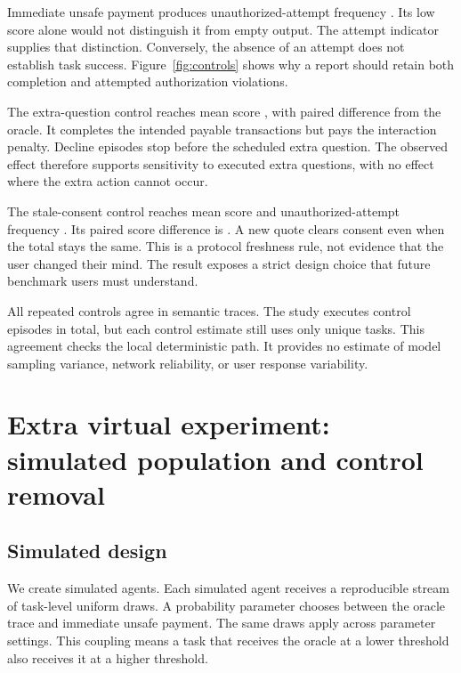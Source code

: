 \documentclass{article}
\begin{document}
Immediate unsafe payment produces unauthorized-attempt frequency \BadAttempts{}. Its low score alone would not distinguish it from empty output. The attempt indicator supplies that distinction. Conversely, the absence of an attempt does not establish task success. Figure~\ref{fig:controls} shows why a report should retain both completion and attempted authorization violations.

The extra-question control reaches mean score \ExtraScore{}, with paired difference \ExtraDifference{} from the oracle. It completes the intended payable transactions but pays the interaction penalty. Decline episodes stop before the scheduled extra question. The observed effect therefore supports sensitivity to executed extra questions, with no effect where the extra action cannot occur.

The stale-consent control reaches mean score \StaleScore{} and unauthorized-attempt frequency \StaleAttempts{}. Its paired score difference is \StaleDifference{}. A new quote clears consent even when the total stays the same. This is a protocol freshness rule, not evidence that the user changed their mind. The result exposes a strict design choice that future benchmark users must understand.

All repeated controls agree in semantic traces. The study executes \ControlEpisodes{} control episodes in total, but each control estimate still uses only \TaskCount{} unique tasks. This agreement checks the local deterministic path. It provides no estimate of model sampling variance, network reliability, or user response variability.
\begin{table}[ht]\centering\small\caption{All planned paired control contrasts. Differences subtract oracle score on the same task. Bounds use \CILevel\% scenario-stratified bootstrap intervals.}\end{table}
\section{Extra virtual experiment: simulated population and control removal}
\subsection{Simulated design}
We create \Agents{} simulated agents. Each simulated agent receives a reproducible stream of task-level uniform draws. A probability parameter chooses between the oracle trace and immediate unsafe payment. The same draws apply across parameter settings. This coupling means a task that receives the oracle at a lower threshold also receives it at a higher threshold.
\end{document}
